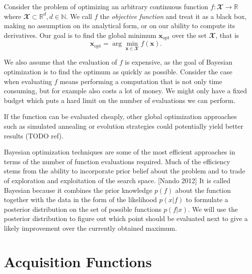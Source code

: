 Consider the problem of optimizing an arbitrary continuous function $f: 𝓧 → ℝ$
where $𝓧 ⊂ ℝ^d, d ∈ ℕ$. We call $f$ the \emph{objective function} and treat it
as a black box, making no assumption on its analytical form, or on our ability
to compute its derivatives. Our goal is to find the global minimum
$\symbf{x}_\text{opt}$ over the set $𝓧$, that is
$$
\symbf{x}_\text{opt} = \arg\min_{\symbf{x} ∈ 𝓧} f(\symbf{x}).
$$

We also assume that the evaluation of $f$ is expensive, as the goal of Bayesian
optimization is to find the optimum as quickly as possible.  Consider the case
when evaluating $f$ means performing a computation that is not only time
consuming, but for example also costs a lot of money. We might only have a
fixed budget which puts a hard limit on the number of evaluations we can
perform.

If the function can be evaluated cheaply, other global optimization approaches
such as simulated annealing or evolution strategies could potentially yield
better results (TODO ref).


Bayesian optimization techniques are some of the most efficient approaches in
terms of the number of function evaluations required. Much of the efficiency
stems from the ability to incorporate prior belief about the problem and to
trade of exploration and exploitation of the search space. [Nando 2012] It is
called Bayesian because it combines the prior knowledge $p(f)$ about the
function together with the data in the form of the likelihood $p(x|f)$ to
formulate a posterior distribution on the set of possible functions $p(f|x)$.
We will use the posterior distribution to figure out which point should be
evaluated next to give a likely improvement over the currently obtained
maximum.

\section{Acquisition Functions}

